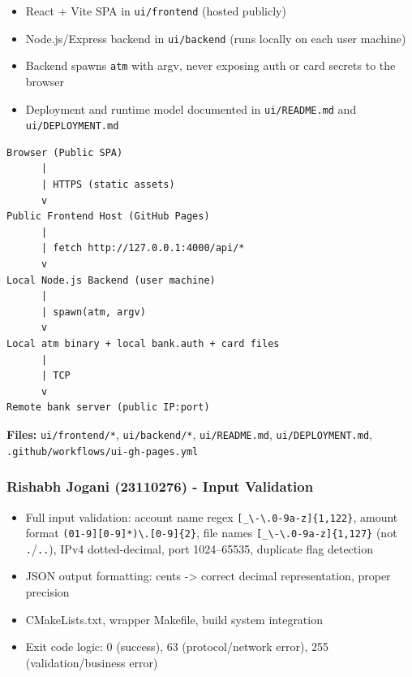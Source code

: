 \documentclass[
]{article}
\providecommand{\tightlist}{%
  \setlength{\itemsep}{0pt}\setlength{\parskip}{0pt}}
\begin{document}
\begin{itemize}
\tightlist
\item
  React + Vite SPA in \texttt{ui/frontend} (hosted publicly)
\item
  Node.js/Express backend in \texttt{ui/backend} (runs locally on each user machine)
\item
  Backend spawns \texttt{atm} with argv, never exposing auth or card secrets to the browser
\item
  Deployment and runtime model documented in \texttt{ui/README.md} and \texttt{ui/DEPLOYMENT.md}
\end{itemize}

\begin{verbatim}
Browser (Public SPA)
      |
      | HTTPS (static assets)
      v
Public Frontend Host (GitHub Pages)
      |
      | fetch http://127.0.0.1:4000/api/*
      v
Local Node.js Backend (user machine)
      |
      | spawn(atm, argv)
      v
Local atm binary + local bank.auth + card files
      |
      | TCP
      v
Remote bank server (public IP:port)
\end{verbatim}

\textbf{Files:} \texttt{ui/frontend/*}, \texttt{ui/backend/*},
\texttt{ui/README.md}, \texttt{ui/DEPLOYMENT.md}, \texttt{.github/workflows/ui-gh-pages.yml}

\hypertarget{rishabh-jogani-23110276---atm-client-business-logic-input-validation}{%
\subsubsection{Rishabh Jogani (23110276) - Input
Validation}\label{rishabh-jogani-23110276---atm-client-business-logic-input-validation}}

\begin{itemize}
\tightlist
\item
  Full input validation: account name regex
  \texttt{{[}\_\textbackslash{}-\textbackslash{}.0-9a-z{]}\{1,122\}},
  amount format
  \texttt{(0\textbar{}{[}1-9{]}{[}0-9{]}*)\textbackslash{}.{[}0-9{]}\{2\}},
  file names
  \texttt{{[}\_\textbackslash{}-\textbackslash{}.0-9a-z{]}\{1,127\}}
  (not \texttt{.}/\texttt{..}), IPv4 dotted-decimal, port 1024--65535,
  duplicate flag detection
\item
  JSON output formatting: cents -\textgreater{} correct decimal
  representation, proper precision
\item
  CMakeLists.txt, wrapper Makefile, build system integration
\item
  Exit code logic: 0 (success), 63 (protocol/network error), 255
  (validation/business error)
\end{itemize}
\end{document}
